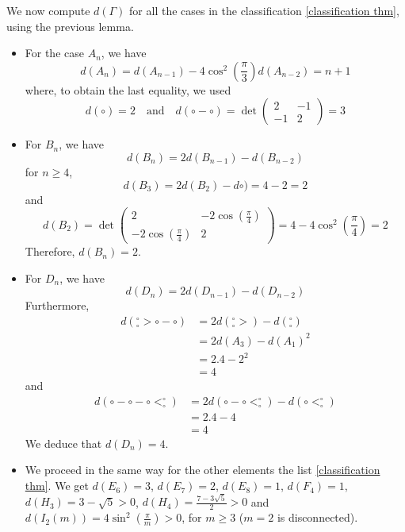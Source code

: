 \documentclass[envcountsame,envcountchap]{svmono}
\begin{document}
We now compute $d(\Gamma)$ for all the cases in the classification \ref{classification thm}, using the previous lemma. 

\begin{itemize}
\item For the case $A_n$, we have
\begin{equation}
d(A_n) = d(A_{n-1} ) - 4 \cos^2 \left(\frac{\pi}{3} \right) d(A_{n-2}) = n+1
\end{equation} where, to obtain the last equality, we used 
\begin{equation}
d(\circ) =2 \quad \text{and} \quad d(\circ-\circ) = \det \begin{pmatrix}
2 &-1 \\
-1 &2 
\end{pmatrix} = 3
\end{equation}
\item For $B_n$, we have
\begin{equation}
d(B_n) = 2 d(B_{n-1} ) - d (B_{n-2})
\end{equation} for $n\ge 4$, 
\begin{equation}
d(B_3) = 2 d (B_2) - d \circ) = 4-2 = 2 
\end{equation} and
\begin{equation}
d(B_2) = \det \begin{pmatrix}
2 &-2 \cos \left(\frac{\pi}{4} \right) \\
-2 \cos \left( \frac{\pi}{4} \right) & 2 
\end{pmatrix} = 4 - 4 \cos^2 \left( \frac{\pi}{4} \right) = 2
\end{equation} Therefore, $d(B_n) = 2$. 
\item For $D_n$, we have
\begin{equation}
d (D_n) = 2 d(D_{n-1}) - d (D_{n-2})
\end{equation} Furthermore, 
\begin{equation}
\begin{split}
d( {}^\circ_\circ > \circ - \circ ) &= 2 d(  {}^\circ_\circ > ) - d ( {}^\circ_\circ) \\
&= 2 d(A_3) - d (A_1)^2 \\
&= 2 . 4 - 2^2 \\
&= 4
\end{split}
\end{equation} and
\begin{equation}
\begin{split}
d(\circ - \circ - \circ < ^\circ_\circ ) &= 2 d (\circ - \circ < ^\circ_\circ ) - d (\circ < ^\circ_\circ) \\
&= 2 .4 - 4 \\
&= 4 
\end{split}
\end{equation} We deduce that $d(D_n) = 4$. 
\item We proceed in the same way for the other elements the list \ref{classification thm}. We get $d(E_6) = 3$, $d(E_7) = 2$, $d(E_8) = 1$, $d(F_4) = 1$, $d(H_3) = 3 - \sqrt{5} > 0$, $d(H_4) = \frac{7 - 3 \sqrt{5}}{2} > 0$ and $d(I_2 (m) ) = 4 \sin^2 \left( \frac{\pi}{m} \right) > 0$, for $m \ge 3$ ($m= 2$ is disconnected). 

\end{itemize} 
\end{document}
